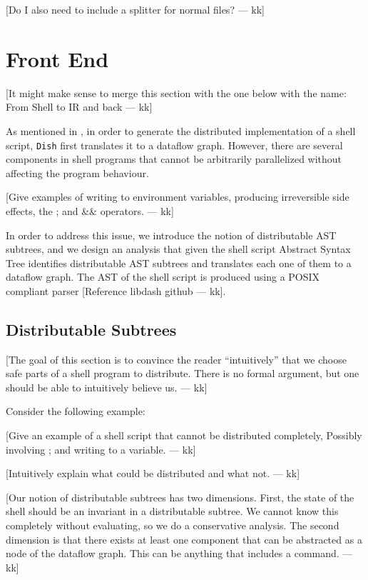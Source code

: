 \documentclass[sigplan,10pt,review,anonymous]{acmart}
\newcommand{\kk}[1]{[{\color{magenta}#1 --- kk}]}
\begin{document}
\kk{Do I also need to include a splitter for normal files?}

\section{Front End}

\kk{It might make sense to merge this section with the one below with
  the name: From Shell to IR and back}

As mentioned in , in order to generate the distributed
implementation of a shell script, \texttt{Dish} first translates it to
a dataflow graph. However, there are several components in shell
programs that cannot be arbitrarily parallelized without affecting the
program behaviour.

\kk{Give examples of writing to environment variables, producing
  irreversible side effects, the ; and \&\& operators.}

In order to address this issue, we introduce the notion of
distributable AST subtrees, and we design an analysis that given the
shell script Abstract Syntax Tree identifies distributable AST
subtrees and translates each one of them to a dataflow graph. The AST
of the shell script is produced using a POSIX compliant parser
\kk{Reference libdash github}.

\subsection{Distributable Subtrees}

\kk{The goal of this section is to convince the reader ``intuitively''
  that we choose safe parts of a shell program to distribute. There is
  no formal argument, but one should be able to intuitively believe
  us.}

Consider the following example:

\kk{Give an example of a shell script that cannot be distributed
  completely, Possibly involving ; and writing to a variable.}

\kk{Intuitively explain what could be distributed and what not.}

\kk{Our notion of distributable subtrees has two dimensions. First,
  the state of the shell should be an invariant in a distributable
  subtree. We cannot know this completely without evaluating, so we do
  a conservative analysis. The second dimension is that there exists
  at least one component that can be abstracted as a node of the
  dataflow graph. This can be anything that includes a command.}
\end{document}
